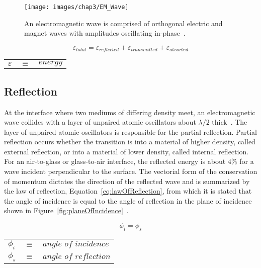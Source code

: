 \begin{figure}[htb]		%
\centering
\texttt{[image: images/chap3/EM\_Wave]}
\caption{An electromagnetic wave is comprised of orthogonal electric and magnet waves with amplitudes oscillating in-phase~\cite{OlympusMicro}.}
\label{fig:EM_Wave}
\end{figure}

\begin{table}		%
\centering
\begin{equation}
\label{eq:waveEnergy}
\varepsilon_{total} = \varepsilon_{reflected} + \varepsilon_{transmitted} + \varepsilon_{absorbed}
\end{equation}
\begin{tabular}{lll}
$\varepsilon$ & $\equiv$ & $\textit{energy}$
\end{tabular}
\end{table}

\subsection{Reflection}
\label{sec:reflection}
At the interface where two mediums of differing density meet, an electromagnetic wave collides with a layer of unpaired atomic oscillators about $\lambda/2$ thick~\cite[p. 96]{Hecht}. The layer of unpaired atomic oscillators is responsible for the partial reflection. Partial reflection occurs whether the transition is into a material of higher density, called external reflection, or into a material of lower density, called internal reflection. For an air-to-glass or glass-to-air interface, the reflected energy is about $4\%$ for a wave incident perpendicular to the surface. The vectorial form of the conservation of momentum dictates the direction of the reflected wave and is summarized by the law of reflection, Equation~\eqref{eq:lawOfReflection}, from which it is stated that the angle of incidence is equal to the angle of reflection in the plane of incidence shown in Figure~\ref{fig:planeOfIncidence}~\cite{Hecht}.

\begin{table}		%
\centering
\begin{equation}
\label{eq:lawOfReflection}
\phi_i = \phi_s
\end{equation}
\begin{tabular}{lll}
$\phi_i$ & $\equiv$ & $\textit{angle of incidence}$\\
$\phi_s$ & $\equiv$ & $\textit{angle of reflection}$
\end{tabular}
\end{table}


